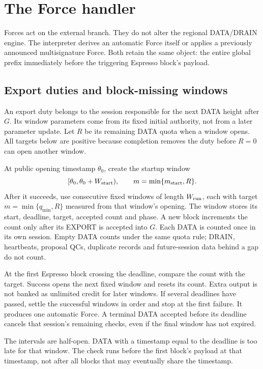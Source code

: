 \documentclass[11pt,a4paper]{article}
\begin{document}
\section{The Force handler}
\label{sec:force}
Forces act on the external branch. They do not alter the regional
DATA/DRAIN engine. The interpreter derives an automatic Force itself
or applies a previously announced multisignature Force.
Both retain the same object: the entire global prefix immediately
before the triggering Espresso block's payload.

\subsection{Export duties and block-missing windows}
\label{sec:windows}
An export duty belongs to the session responsible for the next DATA
height after $G$. Its window parameters come from its fixed initial
authority, not from a later parameter update.
Let $R$ be its remaining DATA quota when a window opens. All targets
below are positive because completion removes the duty before $R=0$
can open another window.

At public opening timestamp $\theta_0$, create the startup window
\[
 [\theta_0,\theta_0+W_{\rm start}),\qquad
 m=\min\{m_{\rm start},R\}.
\]
After it succeeds, use consecutive fixed windows of length
$W_{\rm run}$, each with target $m=\min\{q_{\min},R\}$ measured from
that window's opening. The window stores its start, deadline, target,
accepted count and phase. A new block increments the count only after
its EXPORT is accepted into $G$. Each DATA is counted once in its own
session. Empty DATA counts under the same quota rule; DRAIN, heartbeats,
proposal QCs, duplicate records and future-session data behind a gap
do not count.

At the first Espresso block crossing the deadline, compare the count
with the target. Success opens the next fixed window and resets its
count. Extra output is not banked as unlimited credit for later windows.
If several deadlines have passed, settle the successful windows in
order and stop at the first failure. It produces one automatic Force.
A terminal DATA accepted before its deadline cancels that session's
remaining checks, even if the final window has not expired.

The intervals are half-open. DATA with a timestamp equal to the
deadline is too late for that window. The check runs before the first
block's payload at that timestamp, not after all blocks that may
eventually share the timestamp.
\end{document}
